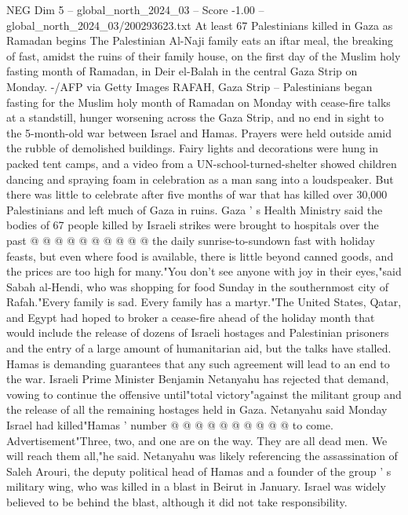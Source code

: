 \begin{textsample}{NEG Dim 5 – global\_north\_2024\_03 – Score -1.00 – global\_north\_2024\_03/200293623.txt}  \label{ex:f5_neg_162}
At least 67 Palestinians killed in Gaza as Ramadan begins The Palestinian Al-Naji family eats an iftar meal, the breaking of fast, amidst the ruins of their family house, on the first day of the Muslim holy fasting month of Ramadan, in Deir el-Balah in the central Gaza Strip on Monday. -/AFP via Getty Images RAFAH, Gaza Strip -- Palestinians began fasting for the Muslim holy month of Ramadan on Monday with cease-fire talks at a standstill, hunger worsening across the Gaza Strip, and no end in sight to the 5-month-old war between Israel and Hamas.
Prayers were held outside amid the rubble of demolished buildings.
Fairy lights and decorations were hung in packed tent camps, and a video from a UN-school-turned-shelter showed children dancing and spraying foam in celebration as a man sang into a loudspeaker.
But there was little to celebrate after five months of war that has killed over 30,000 Palestinians and left much of Gaza in ruins.
Gaza ' s Health Ministry said the bodies of 67 people killed by Israeli strikes were brought to hospitals over the past @ @ @ @ @ @ @ @ @ @ the daily sunrise-to-sundown fast with holiday feasts, but even where food is available, there is little beyond canned goods, and the prices are too high for many."You don't see anyone with joy in their eyes,"said Sabah al-Hendi, who was shopping for food Sunday in the southernmost city of Rafah."Every family is sad.
Every family has a martyr."The United States, Qatar, and Egypt had hoped to broker a cease-fire ahead of the holiday month that would include the release of dozens of Israeli hostages and Palestinian prisoners and the entry of a large amount of humanitarian aid, but the talks have stalled.
Hamas is demanding guarantees that any such agreement will lead to an end to the war.
Israeli Prime Minister Benjamin Netanyahu has rejected that demand, vowing to continue the offensive until"total victory"against the militant group and the release of all the remaining hostages held in Gaza.
Netanyahu said Monday Israel had killed"Hamas ' number @ @ @ @ @ @ @ @ @ @ to come.
Advertisement"Three, two, and one are on the way.
They are all dead men.
We will reach them all,"he said.
Netanyahu was likely referencing the assassination of Saleh Arouri, the deputy political head of Hamas and a founder of the group ' s military wing, who was killed in a blast in Beirut in January.
Israel was widely believed to be behind the blast, although it did not take responsibility.

\end{textsample}
